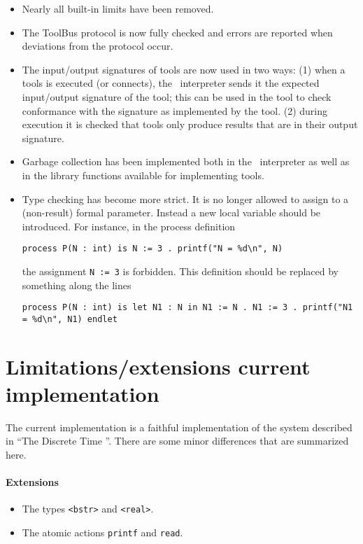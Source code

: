 \documentclass[a4,twoside,noweb]{article} %
\begin{document}
\begin{itemize}
\item Nearly all built-in limits have been removed.
\item The ToolBus protocol is now fully checked and errors are reported
  when deviations from the protocol occur.
\item The input/output signatures of tools are now used in two ways:
(1) when a tools is executed (or connects), the \TB\ interpreter sends it
the expected input/output signature of the tool; this can be used in the
tool to check conformance with the signature as implemented by the tool.
(2) during execution it is checked that tools only produce results that
are in their output signature.
\item Garbage collection has been implemented both in the \TB\ interpreter
as well as in the library functions available for implementing tools.

\item Type checking has become more strict. It is no longer allowed to
assign to a (non-result) formal parameter. Instead a new local variable should be introduced.
For instance, in the process definition
\begin{verbatim}
process P(N : int) is N := 3 . printf("N = %d\n", N)
\end{verbatim}
the assignment {\tt N := 3} is forbidden. This definition should 
be replaced by something along the lines
\begin{verbatim}
process P(N : int) is let N1 : N in N1 := N . N1 := 3 . printf("N1 = %d\n", N1) endlet
\end{verbatim}
\end{itemize}

\section{Limitations/extensions current implementation}

The current implementation is a faithful implementation of the
system described in ``The Discrete Time \TB''. There are some
minor differences that are summarized here.

\paragraph{Extensions}
\begin{itemize}
\item The types {\tt <bstr>} and {\tt <real>}.
\item The atomic actions {\tt printf} and {\tt read}.
\end{itemize}
\end{document}
